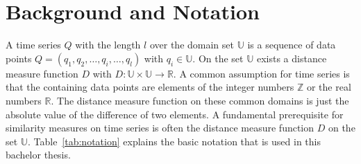 \section{Background and Notation} \label{background_and_notation}
A time series $Q$ with the length $l$ over the domain set $\mathbb{U}$ is a sequence of data points
$Q = (q_1, q_2, \dots, q_i, \dots, q_l)$ with $q_i \in \mathbb{U}$. On the set $\mathbb{U}$ exists a distance measure
function $D$ with $D: \mathbb{U} \times \mathbb{U} \to \mathbb{R}$. A common assumption for time series is that the
containing data points are elements of the integer numbers $\mathbb{Z}$ or the real numbers $\mathbb{R}$. The distance
measure function on these common domains is just the absolute value of the difference of two elements. A fundamental
prerequisite for similarity measures on time series is often the distance measure function $D$ on the set
$\mathbb{U}$. Table~\ref{tab:notation} explains the basic notation that is used in this bachelor thesis.

